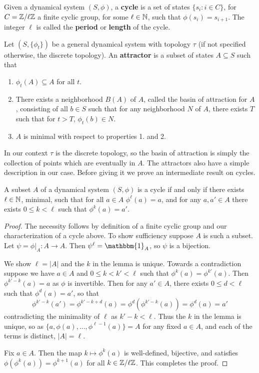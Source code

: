 Given a dynamical system $(S,\phi)$, a \textbf{cycle} is a set of states $\{s_i:i \in C\}$, for $C = \mathbb Z/\ell\mathbb Z$ a finite cyclic group, for some $\ell \in \mathbb N$, such that $\phi(s_i) = s_{i+1}$. The integer $\ell$ is called the \textbf{period} or \textbf{length} of the cycle.


\begin{defn}[label=defn:attractor]
    Let $(S,\{\phi_t\})$ be a general dynamical system with topology $\tau$ (if not specified otherwise, the discrete topology). An \textbf{attractor} is a subset of states $A \subseteq S$ such that \begin{enumerate}
        \item $\phi_t(A) \subseteq A$ for all $t$.
        \item There exists a neighborhood $B(A)$ of $A$, called the basin of attraction for $A$, consisting of all $b \in S$ such that for any neighborhood $N$ of $A$, there exists $T$ such that for $t > T$, $\phi_t(b) \in N$.
        \item $A$ is minimal with respect to properties 1. and 2.
    \end{enumerate}
\end{defn}

In our context $\tau$ is the discrete topology, so the basin of attraction is simply the collection of points which are eventually in $A$. The attractors also have a simple description in our case. Before giving it we prove an intermediate result on cycles.

\begin{lem}[label=lem:cycles]
    A subset $A$ of a dynamical system $(S,\phi)$ is a cycle if and only if there exists $\ell \in \mathbb N$, minimal, such that for all $a \in A$ $\phi^\ell(a) = a$, and for any $a,a' \in A$ there exists $0 \leq k < \ell$ such that $\phi^k(a) = a'$.
\end{lem}
\begin{proof}
    The necessity follows by definition of a finite cyclic group and our characterization of a cycle above. To show sufficiency suppose $A$ is such a subset. Let $\psi = \phi\vert_A:A\rightarrow A$. Then $\psi^{\ell} = \mathbbm{1}_A$, so $\psi$ is a bijection. 
    
    We show $\ell = |A|$ and the $k$ in the lemma is unique. Towards a contradiction suppose we have $a \in A$ and $0 \leq k < k' < \ell$ such that $\phi^k(a) = \phi^{k'}(a)$. Then $\phi^{k'-k}(a) = a$ as $\phi$ is invertible. Then for any $a' \in A$, there exists $0 \leq d < \ell$ such that $\phi^d(a) = a'$, so that $$\phi^{k'-k}(a') = \phi^{k'-k+d}(a) = \phi^d(\phi^{k'-k}(a)) = \phi^d(a) = a'$$
    contradicting the minimality of $\ell$ as $k' - k < \ell$. Thus the $k$ in the lemma is unique, so as $\{a,\phi(a),...,\phi^{\ell-1}(a)\} = A$ for any fixed $a \in A$, and each of the terms is distinct, $|A| = \ell$.

    Fix $a \in A$. Then the map $k\mapsto \phi^k(a)$ is well-defined, bijective, and satisfies $\phi(\phi^k(a)) = \phi^{k+1}(a)$ for all $k \in \mathbb Z/\ell\mathbb Z$. This completes the proof.
\end{proof}


